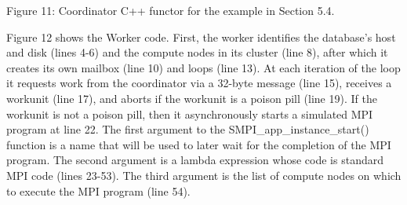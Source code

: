 \documentclass[
]{article}
\begin{document}
Figure 11: Coordinator C++ functor for the example in Section 5.4.

Figure 12 shows the Worker code. First, the worker identifies the
database's host and disk (lines 4-6) and the compute nodes in its
cluster (line 8), after which it creates its own mailbox (line 10) and
loops (line 13). At each iteration of the loop it requests work from the
coordinator via a 32-byte message (line 15), receives a workunit (line
17), and aborts if the workunit is a poison pill (line 19). If the
workunit is not a poison pill, then it asynchronously starts a simulated
MPI program at line 22. The first argument to the
SMPI\_app\_instance\_start() function is a name that will be used to
later wait for the completion of the MPI program. The second argument is
a lambda expression whose code is standard MPI code (lines 23-53). The
third argument is the list of compute nodes on which to execute the MPI
program (line 54).
\end{document}
